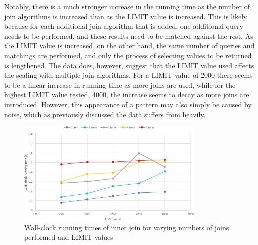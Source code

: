 \documentclass[10pt,a4paper]{article}
\begin{document}
	Notably, there is a much stronger increase in the running time as the number of join algorithms is increased than as the LIMIT value is increased. This is likely because for each additional join algorithm that is added, one additional query needs to be performed, and these results need to be matched against the rest. As the LIMIT value is increased, on the other hand, the same number of queries and matchings are performed, and only the process of selecting values to be returned is lengthened. The data does, however, suggest that the LIMIT value used affects the scaling with multiple join algorithms. For a LIMIT value of 2000 there seems to be a linear increase in running time as more joins are used, while for the highest LIMIT value tested, 4000, the increase seems to decay as more joins are introduced. However, this appearance of a pattern may also simply be caused by noise, which as previously discussed the data suffers from heavily.
	
	\begin{figure}[h!]
		\centering
		\includegraphics[width=0.8\textwidth]{figures/graph_inner_join}
		\caption{Wall-clock running times of inner join for varying numbers of joins performed and LIMIT values}
		\label{fig:inner_join}
	\end{figure}
\end{document}
